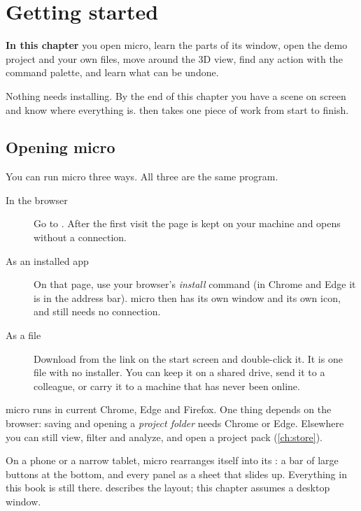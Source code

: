 \chapter{Getting started}\label{ch:start}
\begin{goals}
\textbf{In this chapter} you open micro, learn the parts of its window, open the demo project and your own files, move around the 3D view, find any action with the command palette, and learn what can be undone.
\end{goals}

Nothing needs installing. By the end of this chapter you have a scene on screen and know where everything is.  then takes one piece of work from start to finish.

\section{Opening micro}\label{sec:start-open}
You can run micro three ways. All three are the same program.

\begin{description}
\item[In the browser] Go to . After the first visit the page is kept on your machine and opens without a connection.
\item[As an installed app] On that page, use your browser's \emph{install} command (in Chrome and Edge it is in the address bar). micro then has its own window and its own icon, and still needs no connection.
\item[As a file] Download  from the link on the start screen and double-click it. It is one file with no installer. You can keep it on a shared drive, send it to a colleague, or carry it to a machine that has never been online.
\end{description}

micro runs in current Chrome, Edge and Firefox. One thing depends on the browser: saving and opening a \emph{project folder} needs Chrome or Edge. Elsewhere you can still view, filter and analyze, and open a project pack (\cref{ch:store}).

\begin{note}
On a phone or a narrow tablet, micro rearranges itself into its : a bar of large buttons at the bottom, and every panel as a sheet that slides up. Everything in this book is still there.  describes the layout; this chapter assumes a desktop window.
\end{note}

